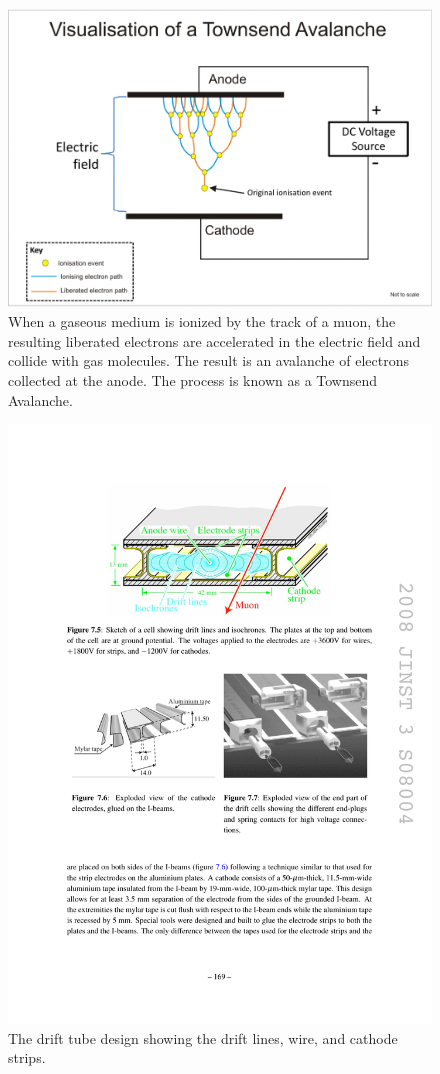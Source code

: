\begin{figure}
\begin{center}
\includegraphics[width=.8\textwidth]{pics/avalanche}
\end{center}
\caption{When a gaseous medium is ionized by the track of a muon, 
the resulting liberated electrons are accelerated in the electric field and collide with gas molecules. The result is an 
avalanche of electrons collected at the anode. The process is known as a Townsend Avalanche.}
\label{fig:avalanche}
\end{figure}

\begin{figure}
\begin{center}
\includegraphics[width=.7\textwidth]{pics/cell_diagram}
\end{center}
\caption{The drift tube design showing the drift lines, wire, and cathode strips.}
\label{fig:cell}
\end{figure}

